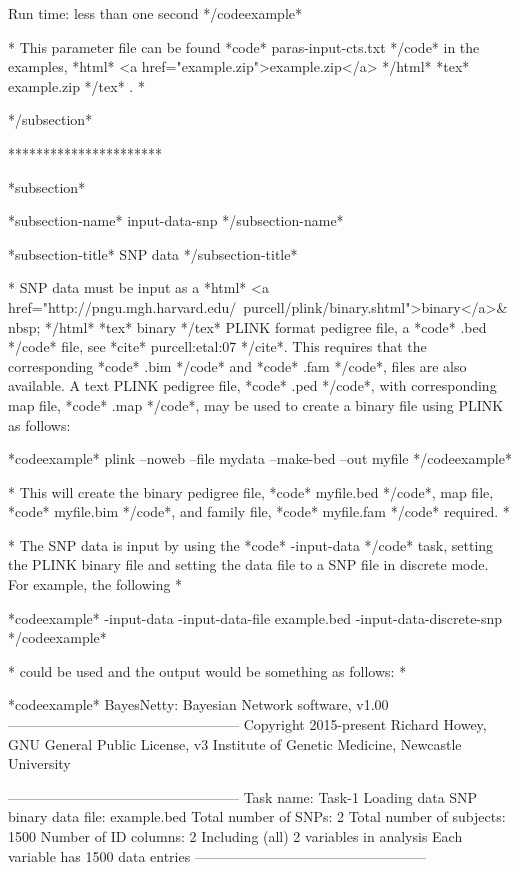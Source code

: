Run time: less than one second */codeexample*

* This parameter file can be found *code* paras-input-cts.txt */code* in the examples, *html* <a href="example.zip">example.zip</a> */html* *tex* example.zip */tex* . *

*/subsection*

**********************

*subsection*

*subsection-name* input-data-snp */subsection-name*

*subsection-title* SNP data */subsection-title*

* SNP data must be input as a *html* <a href="http://pngu.mgh.harvard.edu/~purcell/plink/binary.shtml">binary</a>&nbsp; */html* *tex* binary */tex* PLINK format pedigree file, a *code* .bed */code* file, see *cite* purcell:etal:07 */cite*. This requires that the corresponding *code* .bim */code* and *code* .fam */code*, files are also available. A text PLINK pedigree file, *code* .ped */code*, with corresponding map file, *code* .map */code*, may be used to create a binary file using PLINK as follows:

*codeexample* plink --noweb --file mydata --make-bed --out myfile */codeexample*

* This will create the binary pedigree file, *code* myfile.bed */code*, map file, *code* myfile.bim */code*, and family file, *code* myfile.fam */code* required. *

* The SNP data is input by using the *code* -input-data */code* task, setting the PLINK binary file and setting the data file to a SNP file in discrete mode. For example, the following *

*codeexample* -input-data -input-data-file example.bed -input-data-discrete-snp */codeexample*

* could be used and the output would be something as follows: *

*codeexample* BayesNetty: Bayesian Network software, v1.00 -------------------------------------------------- Copyright 2015-present Richard Howey, GNU General Public License, v3 Institute of Genetic Medicine, Newcastle University

-------------------------------------------------- Task name: Task-1 Loading data SNP binary data file: example.bed Total number of SNPs: 2 Total number of subjects: 1500 Number of ID columns: 2 Including (all) 2 variables in analysis Each variable has 1500 data entries --------------------------------------------------

